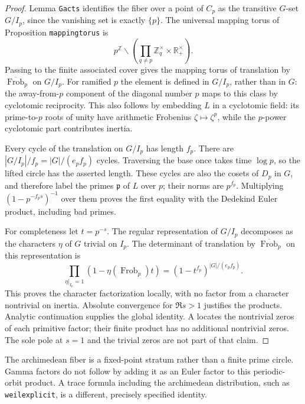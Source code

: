 \begin{proof}
Lemma \texttt{Gacts} identifies the fiber over a point of $C_p$ as the
transitive $G$-set $G/I_p$, since the vanishing set is exactly $\{p\}$.
The universal mapping torus of Proposition \texttt{mappingtorus} is
\[
 p^{\mathbb Z}\backslash
 \left(\prod_{q\ne p}\mathbb Z_q^\times\times
 \mathbb R_+^\times\right).
\]
Passing to the finite associated cover gives the mapping torus of
translation by $\overline{\operatorname{Frob}}_p$ on $G/I_p$.
For ramified $p$ the element is defined in $G/I_p$, rather than in
$G$: the away-from-$p$ component of the diagonal number $p$ maps to
this class by cyclotomic reciprocity.  This also follows by embedding
$L$ in a cyclotomic field: its prime-to-$p$ roots of unity have
arithmetic Frobenius $\zeta\mapsto\zeta^p$, while the $p$-power
cyclotomic part contributes inertia.

Every cycle of the translation on $G/I_p$ has length $f_p$.  There are
$|G/I_p|/f_p=|G|/(e_pf_p)$ cycles.  Traversing the base once takes time
$\log p$, so the lifted circle has the asserted length.  These cycles
are also the cosets of $D_p$ in $G$, and therefore label the primes
$\mathfrak p$ of $L$ over $p$; their norms are $p^{f_p}$.
Multiplying $(1-p^{-f_ps})^{-1}$ over them proves the first equality
with the Dedekind Euler product, including bad primes.

For completeness let $t=p^{-s}$.  The regular representation of
$G/I_p$ decomposes as the characters $\eta$ of $G$ trivial on $I_p$.
The determinant of translation by
$\overline{\operatorname{Frob}}_p$ on this representation is
\[
 \prod_{\eta|_{I_p}=1}(1-\eta(\operatorname{Frob}_p)t)
 =(1-t^{f_p})^{|G|/(e_pf_p)}.
\]
This proves the character factorization locally, with no factor from
a character nontrivial on inertia.  Absolute convergence for
$\Re s>1$ justifies the products.  Analytic continuation supplies the
global identity.  A locates the nontrivial zeros of each primitive
factor; their finite product has no additional nontrivial zeros.
The sole pole at $s=1$ and the trivial zeros are not part of that
claim.
\end{proof}

\begin{remark}
The archimedean fiber is a fixed-point stratum rather than a finite
prime circle.  Gamma factors do not follow by adding it as an Euler
factor to this periodic-orbit product.  A trace formula including the
archimedean distribution, such as \texttt{weilexplicit}, is a
different, precisely specified identity.
\end{remark}


